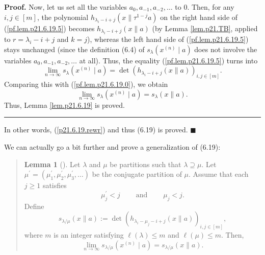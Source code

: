 \documentclass[numbers=enddot,12pt,final,onecolumn,notitlepage]{scrartcl}%
\newenvironment{statement}{\begin{quote}}{\end{quote}}
\theoremstyle{definition}
\newtheorem{lem}[theo]{Lemma}
\newenvironment{lemmain}[1][]
{\begin{statement}\begin{lem}[#1]}
{\end{lem}\end{statement}}
\newenvironment{proof}[1][Proof]{\noindent\textbf{#1.} }{\ \rule{0.5em}{0.5em}}
\newenvironment{lemmain}[1][Proof]{\noindent\textbf{#1.} }{\ \rule{0.5em}{0.5em}}
\newenvironment{noncompile}{}{}
\begin{document}
\begin{enumerate}
\begin{proof}
Now, let us set all the variables $a_{0},a_{-1},a_{-2},\ldots$ to $0$. Then,
for any $i,j\in\left[  m\right]  $, the polynomial $h_{\lambda_{i}-i+j}\left(
x\parallel\tau^{1-j}a\right)  $ on the right hand side of
(\ref{pf.lem.p21.6.19.5}) becomes $h_{\lambda_{i}-i+j}\left(  x\parallel
a\right)  $ (by Lemma \ref{lem.p21.TB}, applied to $r=\lambda_{i}-i+j$ and
$k=j$), whereas the left hand side of (\ref{pf.lem.p21.6.19.5}) stays
unchanged (since the definition (6.4) of $s_{\lambda}\left(  x^{\left(
n\right)  }\mid a\right)  $ does not involve the variables $a_{0}%
,a_{-1},a_{-2},\ldots$ at all). Thus, the equality (\ref{pf.lem.p21.6.19.5})
turns into%
\[
\lim\limits_{n\rightarrow\infty}s_{\lambda}\left(  x^{\left(  n\right)  }\mid
a\right)  =\det\left(  h_{\lambda_{i}-i+j}\left(  x\parallel a\right)
\right)  _{i,j\in\left[  m\right]  }.
\]
Comparing this with (\ref{pf.lem.p21.6.19.0}), we obtain%
\[
\lim\limits_{n\rightarrow\infty}s_{\lambda}\left(  x^{\left(  n\right)  }\mid
a\right)  =s_{\lambda}\left(  x\parallel a\right)  .
\]
Thus, Lemma \ref{lem.p21.6.19} is proved.
\end{proof}

In other words, (\ref{p21.6.19.rewr}) and thus (6.19) is proved.
$\blacksquare$

\begin{noncompile}
We can actually go a bit further and prove a generalization of (6.19):

\begin{lemmain}
\label{lem.p21.6.19skew}Let $\lambda$ and $\mu$ be partitions such that
$\lambda\supseteq\mu$. Let $\mu^{\prime}=\left(  \mu_{1}^{\prime},\mu
_{2}^{\prime},\mu_{3}^{\prime},\ldots\right)  $ be the conjugate partition of
$\mu$. Assume that each $j\geq1$ satisfies%
\begin{equation}
\mu_{j}^{\prime}<j\ \ \ \ \ \ \ \ \ \ \text{and}\ \ \ \ \ \ \ \ \ \ \mu_{j}<j.
\label{eq.lem.p21.6.19skew.ass}%
\end{equation}
Define%
\begin{equation}
s_{\lambda/\mu}\left(  x\parallel a\right)  :=\det\left(  h_{\lambda_{i}%
-\mu_{j}-i+j}\left(  x\parallel a\right)  \right)  _{i,j\in\left[  m\right]
}, \label{eq.lem.p21.6.19skew.def}%
\end{equation}
where $m$ is an integer satisfying $\ell\left(  \lambda\right)  \leq m$ and
$\ell\left(  \mu\right)  \leq m$. Then,%
\[
\lim\limits_{n\rightarrow\infty}s_{\lambda/\mu}\left(  x^{\left(  n\right)
}\mid a\right)  =s_{\lambda/\mu}\left(  x\parallel a\right)  .
\]


\end{lemmain}
\end{noncompile}
\end{enumerate}
\end{document}
